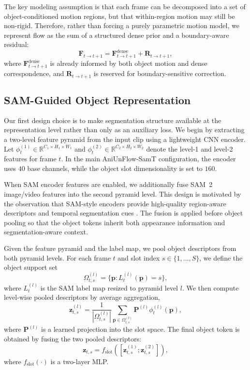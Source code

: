 The key modeling assumption is that each frame can be decomposed into a set of object-conditioned motion regions, but that within-region motion may still be non-rigid. Therefore, rather than forcing a purely parametric motion model, we represent flow as the sum of a structured dense prior and a boundary-aware residual:
\begin{equation}
\label{eq:flow_decomposition}
\mathbf{F}_{t\rightarrow t+1} = \mathbf{F}^{\mathrm{dense}}_{t\rightarrow t+1} + \mathbf{R}_{t\rightarrow t+1},
\end{equation}
where $\mathbf{F}^{\mathrm{dense}}_{t\rightarrow t+1}$ is already informed by both object motion and dense correspondence, and $\mathbf{R}_{t\rightarrow t+1}$ is reserved for boundary-sensitive correction.

\subsection{SAM-Guided Object Representation}

Our first design choice is to make segmentation structure available at the representation level rather than only as an auxiliary loss. We begin by extracting a two-level feature pyramid from the input clip using a lightweight CNN encoder. Let $\phi_t^{(1)} \in \mathbb{R}^{C_1\times H_1\times W_1}$ and $\phi_t^{(2)} \in \mathbb{R}^{C_2\times H_2\times W_2}$ denote the level-1 and level-2 features for frame $t$. In the main AniUnFlow-SamT configuration, the encoder uses $40$ base channels, while the object slot dimensionality is set to $160$.

When SAM encoder features are enabled, we additionally fuse SAM~2 image/video features into the second pyramid level. This design is motivated by the observation that SAM-style encoders provide high-quality region-aware descriptors and temporal segmentation cues \cite{sam,ravi2024sam2}. The fusion is applied before object pooling so that the object tokens inherit both appearance information and segmentation-aware context.

Given the feature pyramid and the label map, we pool object descriptors from both pyramid levels. For each frame $t$ and slot index $s\in\{1,\dots,S\}$, we define the object support set
\begin{equation}
\Omega_{t,s}^{(l)} = \{\mathbf{p} : L_t^{(l)}(\mathbf{p}) = s\},
\end{equation}
where $L_t^{(l)}$ is the SAM label map resized to pyramid level $l$. We then compute level-wise pooled descriptors by average aggregation,
\begin{equation}
\mathbf{z}_{t,s}^{(l)} = \frac{1}{|\Omega_{t,s}^{(l)}|} \sum_{\mathbf{p} \in \Omega_{t,s}^{(l)}} \mathbf{P}^{(l)}\phi_t^{(l)}(\mathbf{p}),
\end{equation}
where $\mathbf{P}^{(l)}$ is a learned projection into the slot space. The final object token is obtained by fusing the two pooled descriptors:
\begin{equation}
\mathbf{z}_{t,s} = f_{\mathrm{slot}}\left([\mathbf{z}_{t,s}^{(1)} ; \mathbf{z}_{t,s}^{(2)}]\right),
\end{equation}
where $f_{\mathrm{slot}}(\cdot)$ is a two-layer MLP.


